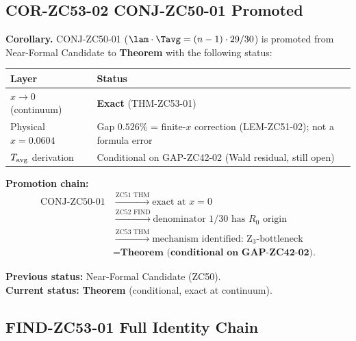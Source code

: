\documentclass[12pt, a4paper]{article}
\begin{document}
\subsection{COR-ZC53-02 \quad CONJ-ZC50-01 Promoted}
\label{zc53:sec:cor02}


\begin{formalbox}[title={COR-ZC53-02: CONJ-ZC50-01 Promoted
  to Theorem (Conditional)}]
\textbf{Corollary.}
CONJ-ZC50-01 ($\lam\cdot\Tavg = (n-1)\cdot 29/30$)
is promoted from Near-Formal Candidate to
\textbf{Theorem} with the following status:

\begin{center}
\begin{tabular}{@{}lp{8cm}@{}}
\toprule
Layer & Status \\
\midrule
$x\to 0$ (continuum) & \textbf{Exact} (THM-ZC53-01) \\
Physical $x=0.0604$ & Gap $0.526\%$ = finite-$x$ correction
  (LEM-ZC51-02); not a formula error \\
$T_{\rm avg}$ derivation & Conditional on GAP-ZC42-02 (Wald
  residual, still open) \\
\bottomrule
\end{tabular}
\end{center}

\textbf{Promotion chain:}
\begin{align*}
  \text{CONJ-ZC50-01}
  &\xrightarrow{\text{ZC51 THM}} \text{exact at }x=0 \\
  &\xrightarrow{\text{ZC52 FIND}} \text{denominator }1/30
    \text{ has }R_0\text{ origin} \\
  &\xrightarrow{\text{ZC53 THM}} \text{mechanism identified:
    Z}_3\text{-bottleneck} \\
  &= \textbf{Theorem (conditional on GAP-ZC42-02).}
\end{align*}

\textbf{Previous status:} Near-Formal Candidate (ZC50).\\
\textbf{Current status:} \textbf{Theorem} (conditional,
  exact at continuum).
\end{formalbox}

\subsection{FIND-ZC53-01 \quad Full Identity Chain}
\label{zc53:sec:find01}
\end{document}
